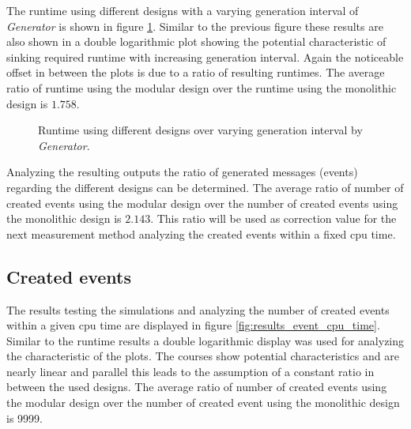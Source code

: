 The runtime using different designs with a varying generation interval of \emph{Generator} is shown in figure \ref{fig:results_runtime_generation}.
Similar to the previous figure these results are also shown in a double logarithmic plot showing the potential characteristic of sinking required runtime with increasing generation interval.
Again the noticeable offset in between the plots is due to a ratio of resulting runtimes.
The average ratio of runtime using the modular design over the runtime using the monolithic design is $1.758$.
\\

\begin{figure}
    \centering
    \caption{Runtime using different designs over varying generation interval by \emph{Generator}.}
    \label{fig:results_runtime_generation}
\end{figure}


Analyzing the resulting outputs the ratio of generated messages (events) regarding the different designs can be determined.
The average ratio of number of created events using the modular design over the number of created events using the monolithic design is $2.143$.%
This ratio will be used as correction value for the next measurement method analyzing the created events within a fixed cpu time.

\subsection{Created events}
\label{sec:measurements_sequential_event}

The results testing the simulations and analyzing the number of created events within a given cpu time are displayed in figure \ref{fig:results_event_cpu_time}.
Similar to the runtime results a double logarithmic display was used for analyzing the characteristic of the plots.
The courses show potential characteristics and are nearly linear and parallel this leads to the assumption of a constant ratio in between the used designs.
The average ratio of number of created events using the modular design over the number of created event using the monolithic design is 9999. %
\\

